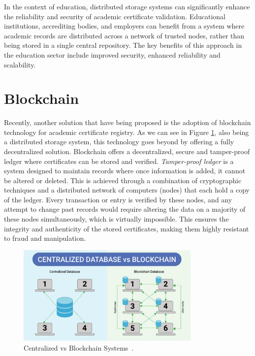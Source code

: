 In the context of education, distributed storage systems can significantly enhance the reliability and security of academic certificate validation.
Educational institutions, accrediting bodies, and employers can benefit from a system where academic records are distributed across a network of trusted nodes,
rather than being stored in a single central repository.
The key benefits of this approach in the education sector include improved security, enhanced reliability and scalability.

\section{Blockchain}\label{sec:blockchain}
\paragraph{}

Recently, another solution that have being proposed is the adoption of blockchain technology for academic certificate registry. As we can see in Figure \ref{fig:blockchain-vs-database}, also being a distributed storage system, this technology goes beyond by offering a fully decentralized solution.
Blockchain offers a decentralized, secure and tamper-proof ledger where certificates can be stored and verified.
\textit{Tamper-proof ledger} is a system designed to maintain records where once information is added, it cannot be altered or deleted. This is achieved through a combination of cryptographic techniques and a distributed network of computers (nodes) that each hold a copy of the ledger.
Every transaction or entry is verified by these nodes, and any attempt to change past records would require altering the data on a majority of these nodes simultaneously, which is virtually impossible. This ensures the integrity and authenticity of the stored certificates, making them highly resistant to fraud and manipulation.

\begin{figure}[H]\label{fig:blockchain-vs-database}
    \centering
    \includegraphics[width=0.8\textwidth]{assets/blockchain-vs-database.png}
    \caption{Centralized vs Blockchain Systems~\cite{blockchainDB}.}
\end{figure}

